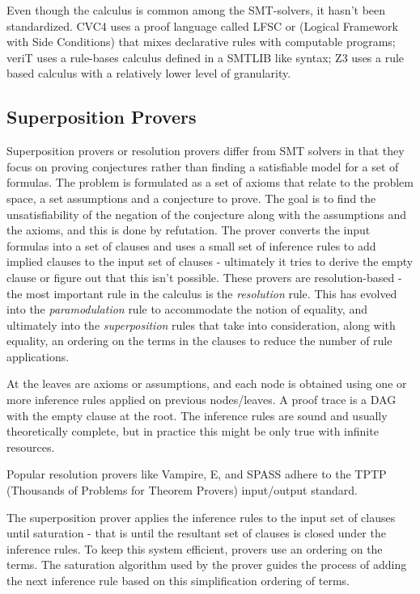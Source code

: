 \documentclass{article}
\begin{document}
	Even though the calculus is common among the SMT-solvers, 
	it hasn't been standardized. CVC4 uses a proof language called
	LFSC or (Logical Framework with Side Conditions) that mixes 
	declarative rules with computable programs; veriT uses a rule-bases 
	calculus defined in a SMTLIB like syntax; Z3 uses a rule based 
	calculus with a relatively lower level of granularity. 
	
	\subsection{Superposition Provers}
	\label{sup}
	Superposition provers or resolution provers differ 
	from SMT solvers in that they focus on proving 
	conjectures rather than finding a satisfiable model
	for a set of formulas. The problem is formulated 
	as a set of axioms that relate to the problem space, 
	a set assumptions and a conjecture to prove. 
	The goal is to find the unsatisfiability of 
	the negation of the conjecture along with the 
	assumptions and the axioms, and this is done 
	by refutation. The prover converts 
	the input formulas into a set of clauses and 
	uses a small set of inference rules to add 
	implied clauses to the input set of 
	clauses - ultimately it tries to derive 
	the empty clause or figure out that this 
	isn't possible. These provers are resolution-based -
	the most important rule in the calculus is the 
	\textit{resolution} rule. This has evolved into 
	the \textit{paramodulation} rule to accommodate 
	the notion of equality, and ultimately into 
	the \textit{superposition} rules that take into 
	consideration, along with equality, an ordering 
	on the terms in the clauses to reduce the number 
	of rule applications.
	
	At the leaves are axioms or assumptions, and 
	each node is obtained using one or more inference
	rules applied on previous nodes/leaves. 
	A proof trace is a DAG with the empty clause at
	the root. The inference rules are sound and 
	usually theoretically complete, but in practice 
	this might be only true with infinite resources.
	
	Popular resolution provers like Vampire, E, and 
	SPASS adhere to the TPTP (Thousands of Problems 
	for Theorem Provers) input/output standard.
	
	The superposition prover applies the inference 
	rules to the input set of 
	clauses until saturation - that is until the 
	resultant set of clauses is closed under the 
	inference rules. To keep this system
	efficient, provers use an ordering 
	on the terms. The saturation algorithm used 
	by the prover guides the process of adding the 
	next inference rule based on this simplification 
	ordering of terms.
	
\end{document}
